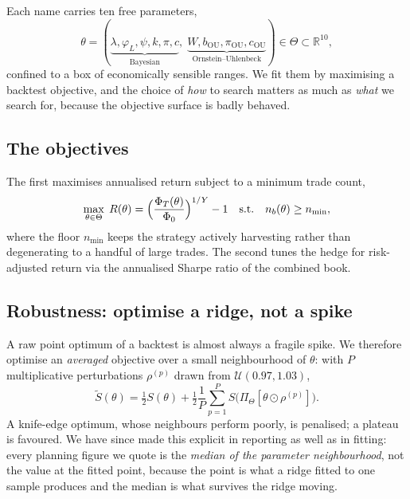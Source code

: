 \documentclass[11pt]{article}
\begin{document}
Each name carries ten free parameters,
\begin{equation}
\theta=(\underbrace{\lambda,\varphi_L,\psi,k,\pi,c}_{\text{Bayesian}},\;
\underbrace{W,b_{\text{OU}},\pi_{\text{OU}},c_{\text{OU}}}_{\text{Ornstein--Uhlenbeck}})
\in\Theta\subset\mathbb R^{10},
\end{equation}
confined to a box of economically sensible ranges. We fit them by maximising a backtest
objective, and the choice of \emph{how} to search matters as much as \emph{what} we search for,
because the objective surface is badly behaved.

\subsection{The objectives}
The first maximises annualised return subject to a minimum trade count,
\begin{equation}
\max_{\theta\in\Theta}\;R(\theta)=\Bigl(\frac{\Phi_T(\theta)}{\Phi_0}\Bigr)^{1/Y}-1
\quad\text{s.t.}\quad n_b(\theta)\ge n_{\min},
\end{equation}
where the floor $n_{\min}$ keeps the strategy actively harvesting rather than degenerating to a
handful of large trades. The second tunes the hedge for risk-adjusted return via the annualised
Sharpe ratio of the combined book.

\subsection{Robustness: optimise a ridge, not a spike}
A raw point optimum of a backtest is almost always a fragile spike. We therefore optimise an
\emph{averaged} objective over a small neighbourhood of $\theta$: with $P$ multiplicative
perturbations $\rho^{(p)}$ drawn from $\mathcal U(0.97,1.03)$,
\begin{equation}
\tilde S(\theta)=\tfrac12 S(\theta)+\tfrac12\frac1P\sum_{p=1}^{P}
S\bigl(\Pi_\Theta[\theta\odot\rho^{(p)}]\bigr).
\end{equation}
A knife-edge optimum, whose neighbours perform poorly, is penalised; a plateau is favoured. We
have since made this explicit in reporting as well as in fitting: every planning figure we quote
is the \emph{median of the parameter neighbourhood}, not the value at the fitted point, because
the point is what a ridge fitted to one sample produces and the median is what survives the ridge
moving.
\end{document}
